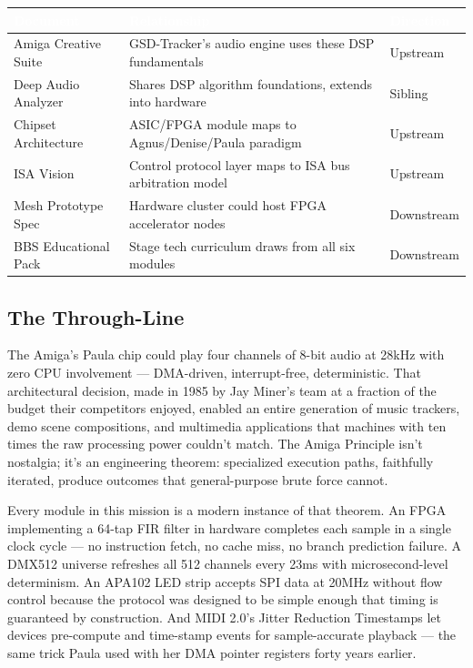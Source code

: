 \documentclass[11pt,letterpaper]{article}
\newcommand{\tableheader}[1]{\textbf{\sffamily\textcolor{white}{#1}}}
\begin{document}
\begin{center}
\begin{tabularx}{\textwidth}{L{4cm}XC{2.5cm}}
\toprule
{}
\tableheader{Document} & \tableheader{Relationship} & \tableheader{Direction} \\
\midrule
Amiga Creative Suite & GSD-Tracker's audio engine uses these DSP fundamentals & Upstream \\
Deep Audio Analyzer & Shares DSP algorithm foundations, extends into hardware & Sibling \\
Chipset Architecture & ASIC/FPGA module maps to Agnus/Denise/Paula paradigm & Upstream \\
ISA Vision & Control protocol layer maps to ISA bus arbitration model & Upstream \\
Mesh Prototype Spec & Hardware cluster could host FPGA accelerator nodes & Downstream \\
BBS Educational Pack & Stage tech curriculum draws from all six modules & Downstream \\
\bottomrule
\end{tabularx}
\end{center}

\subsection{The Through-Line}

The Amiga's Paula chip could play four channels of 8-bit audio at 28kHz with zero CPU involvement --- DMA-driven, interrupt-free, deterministic. That architectural decision, made in 1985 by Jay Miner's team at a fraction of the budget their competitors enjoyed, enabled an entire generation of music trackers, demo scene compositions, and multimedia applications that machines with ten times the raw processing power couldn't match. The Amiga Principle isn't nostalgia; it's an engineering theorem: specialized execution paths, faithfully iterated, produce outcomes that general-purpose brute force cannot.

Every module in this mission is a modern instance of that theorem. An FPGA implementing a 64-tap FIR filter in hardware completes each sample in a single clock cycle --- no instruction fetch, no cache miss, no branch prediction failure. A DMX512 universe refreshes all 512 channels every 23ms with microsecond-level determinism. An APA102 LED strip accepts SPI data at 20MHz without flow control because the protocol was designed to be simple enough that timing is guaranteed by construction. And MIDI 2.0's Jitter Reduction Timestamps let devices pre-compute and time-stamp events for sample-accurate playback --- the same trick Paula used with her DMA pointer registers forty years earlier.
\end{document}
